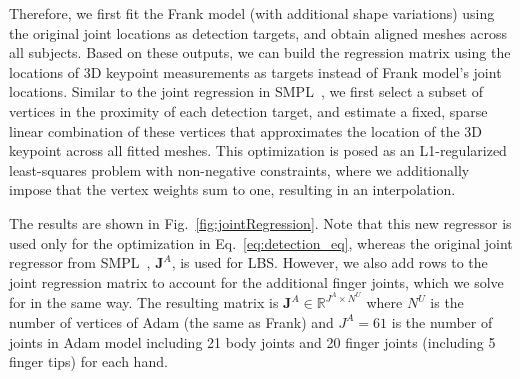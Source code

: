 Therefore, we first fit the Frank model (with additional shape variations) using the original joint locations as detection targets, and obtain aligned meshes across all subjects. Based on these outputs, we can build the regression matrix using the  locations of 3D keypoint measurements as targets instead of Frank model's joint locations. Similar to the joint regression in SMPL~\cite{Loper2015}, we first select a subset of vertices in the proximity of each detection target, and estimate a fixed, sparse linear combination of these vertices that approximates the location of the 3D keypoint across all fitted meshes. This optimization is posed as an L1-regularized least-squares problem with non-negative constraints, where we additionally impose that the vertex weights sum to one, resulting in an interpolation. 

The results are shown in Fig.~\ref{fig:jointRegression}. Note that this new regressor is used only for the optimization in Eq.~\eqref{eq:detection_eq}, whereas the original joint regressor from SMPL~\cite{Loper2015}, $\mathbf{J}^A$, is used for LBS. However, we also add rows to the joint regression matrix to account for the additional finger joints, which we solve for in the same way. The resulting matrix is $\mathbf{J}^A \in \mathds{R}^{J^A\times N^U}$ where $N^U$ is the number of vertices of Adam (the same as Frank) and $J^A=61$ is the number of joints in Adam model including 21 body joints and 20 finger joints (including 5 finger tips) for each hand. 






